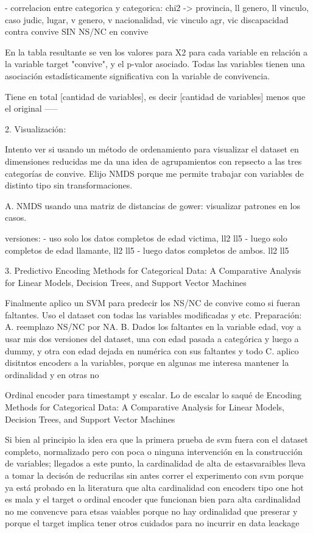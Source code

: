 \documentclass[10pt, spanish]{article}
\begin{document}
- correlacion entre categorica y categorica: chi2 -> provincia, ll genero, ll vinculo, caso judic, lugar, v genero, v nacionalidad, vic vinculo agr, vic discapacidad contra convive
SIN NS/NC en convive

En la tabla resultante se ven los valores para X2 para cada variable en relación a la variable target "convive", y el p-valor asociado. Todas las variables tienen una asociación estadísticamente significativa con la variable de convivencia.
 
Tiene en total [cantidad de variables], es decir [cantidad de  variables] menos que el original 
-----

2. Visualización:

Intento ver si usando un método de ordenamiento para visualizar el dataset en dimensiones reducidas me da una
idea de agrupamientos con repsecto a las tres categorías de convive. Elijo NMDS porque me permite trabajar con
variables de distinto tipo sin transformaciones.



A. NMDS usando una matriz de distancias de gower: visualizar patrones en los casos. 

versiones:  
- uso solo los datos completos de edad victima, ll2 ll5
- luego solo completos de edad llamante, ll2 ll5
- luego datos completos de ambos. ll2 ll5



3. Predictivo
Encoding Methods for Categorical Data: A Comparative Analysis for Linear Models, Decision Trees, and Support Vector Machines

Finalmente aplico un SVM para predecir los NS/NC de convive como si fueran faltantes.
Uso el dataset con todas las variables modificadas y etc.
Preparación: 
A. reemplazo NS/NC por NA.
B. Dados los faltantes en la variable edad, voy a usar mis dos versiones del dataset, una con
edad pasada a categórica y luego a dummy, y otra con edad dejada en numérica con sus faltantes y todo
C. aplico disitntos encoders a la variables, porque en algunas me interesa mantener la ordinalidad y en otras no


Ordinal encoder para timestampt y escalar. Lo de escalar lo saqué de Encoding Methods for Categorical Data: A Comparative Analysis for Linear Models, Decision Trees, and Support Vector Machines


Si bien al principio la idea era que la primera prueba de svm fuera con el dataset completo, normalizado pero con poca o ninguna intervención en la construcción de variables; llegados a este punto, la cardinalidad de alta de estasvaraibles lleva a tomar la decisón de reducrilas sin antes correr el experimento con svm porque ya está probado en la literatura que alta cardinalidad con encoders tipo one hot es mala y el target o ordinal encoder que funcionan bien para alta cardinalidad no me convencve para etsas vaiables porque no hay ordinalidad que preserar y porque el target implica tener otros cuidados para no incurrir en data leackage
\end{document}
